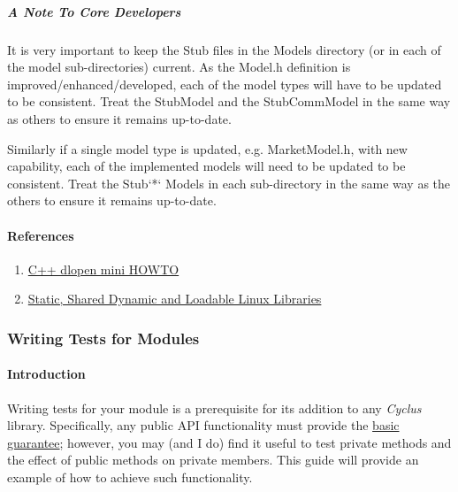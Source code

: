 \documentclass[letterpaper,10pt,english]{sphinxmanual}
\begin{document}
\subparagraph{A Note To Core Developers}
\label{devdoc/make-models/main:a-note-to-core-developers}
It is very important to keep the Stub files in the Models directory (or in each
of the model sub-directories) current.  As the Model.h definition is
improved/enhanced/developed, each of the model types will have to be updated to
be consistent.  Treat the StubModel and the StubCommModel in the same way as
others to ensure it remains up-to-date.

Similarly if a single model type is updated, e.g. MarketModel.h, with new
capability, each of the implemented models will need to be updated to be
consistent.  Treat the Stub{}`*{}` Models in each sub-directory in the same way as
the others to ensure it remains up-to-date.


\paragraph{References}
\label{devdoc/make-models/main:references}\begin{enumerate}
\item {} 
\href{http://oss.sgi.com/LDP/HOWTO/C++-dlopen/index.html}{C++ dlopen mini HOWTO}

\item {} 
\href{http://www.yolinux.com/TUTORIALS/LibraryArchives-StaticAndDynamic.html}{Static, Shared Dynamic and Loadable Linux Libraries}

\end{enumerate}


\subsubsection{Writing Tests for Modules}
\label{devdoc/testing::doc}\label{devdoc/testing:writing-tests-for-modules}

\paragraph{Introduction}
\label{devdoc/testing:introduction}
Writing tests for your module is a prerequisite for its addition to
any \emph{Cyclus} library. Specifically, any public API functionality must
provide the \href{http://en.wikipedia.org/wiki/Exception\_guarantees}{basic guarantee}; however, you
may (and I do) find it useful to test private methods and the effect
of public methods on private members. This guide will provide an
example of how to achieve such functionality.
\end{document}
